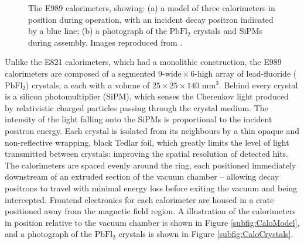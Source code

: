 \begin{figure}[t!]
\centering{}
\hfill
{}
\caption{The E989 calorimeters, showing: (a) a model of three calorimeters in position during operation, with an incident decay positron indicated by a blue line; (b) a photograph of the $\text{PbFl}_{2}$ crystals and SiPMs during assembly. Images reproduced from \cite{CaloCommissioning}.}
\label{fig:Calos}
\end{figure} 

Unlike the E821 calorimeters, which had a monolithic construction, the E989 calorimeters are composed of a segmented $9\text{-wide}\times6\text{-high}$ array of lead-fluoride ($\text{PbFl}_{2}$) crystals, a each with a volume of $25\times25\times140$ $\text{mm}^3$. Behind every crystal is a silicon photomultiplier (SiPM), which senses the Cherenkov light produced by relativistic charged particles passing through the crystal medium. The intensity of the light falling onto the SiPMs is proportional to the incident positron energy. Each crystal is isolated from its neighbours by a thin opaque and non-reflective wrapping, black Tedlar foil, which greatly limits the level of light transmitted between crystals: improving the spatial resolution of detected hits. The calorimeters are spaced evenly around the ring, each positioned immediately downstream of an extruded section of the vacuum chamber -- allowing decay positrons to travel with minimal energy loss before exiting the vacuum and being intercepted. Frontend electronics for each calorimeter are housed in a crate positioned away from the magnetic field region. A illustration of the calorimeters in position relative to the vacuum chamber is shown in Figure \ref{subfig:CaloModel}, and a photograph of the $\text{PbFl}_{2}$ crystals is shown in Figure \ref{subfig:CaloCrystals}. 

